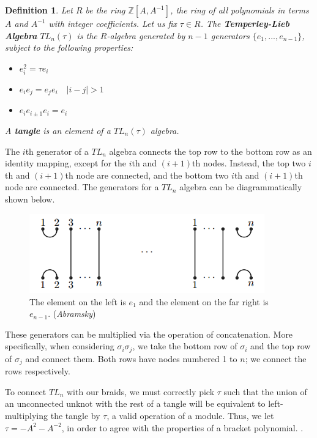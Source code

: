 \documentclass[12pt]{article}
\newcommand{\Z}{\mathbb{Z}}
\newtheorem{definition}{Definition}[section]
\begin{document}
\begin{definition}
Let $R$ be the ring $\Z[A, A^{-1}]$, the ring of all polynomials in terms $A$ and $A^{-1}$ with integer coefficients. Let us fix $\tau \in R$. The \textbf{Temperley-Lieb Algebra} $TL_n(\tau)$ is the $R$-algebra generated by $n-1$ generators $\{e_1, ..., e_{n-1}\}$, subject to the following properties:

\begin{itemize}
\item $e_i^2 = \tau e_i$
\item $e_i e_j = e_j e_i \quad |i - j| > 1$
\item $e_i e_{i \pm 1} e_i = e_i$
\end{itemize}

A \textbf{tangle} is an element of a $TL_n(\tau)$ algebra. 
\end{definition}

The $i$th generator of a $TL_n$ algebra connects the top row to the bottom row as an identity mapping, except for the $i$th and $(i+1)$th nodes. Instead, the top two $i$th and $(i+1)$th node are connected, and the bottom two $i$th and $(i+1)$th node are connected. The generators for a $TL_n$ algebra can be diagrammatically shown below. 

\begin{figure}[H]
\centering
\includegraphics[width=4in]{tlgenerators}
\caption{\label{Temperley Leib} The element on the left is $e_1$ and the element on the far right is $e_{n-1}$.  (\textit{Abramsky})}
\end{figure}

These generators can be multiplied via the operation of concatenation. More specifically, when considering $\sigma_i \sigma_j$, we take the bottom row of $\sigma_i$ and the top row of $\sigma_j$ and connect them. Both rows have nodes numbered 1 to $n$; we connect the rows respectively. 
 
To connect $TL_n$ with our braids, we must correctly pick $\tau$ such that the union of an unconnected unknot with the rest of a tangle will be equivalent to left-multiplying the tangle by $\tau$, a valid operation of a module. Thus, we let $\tau = -A^2 - A^{-2}$, in order to agree with the properties of a bracket polynomial. . 
 
\end{document}
